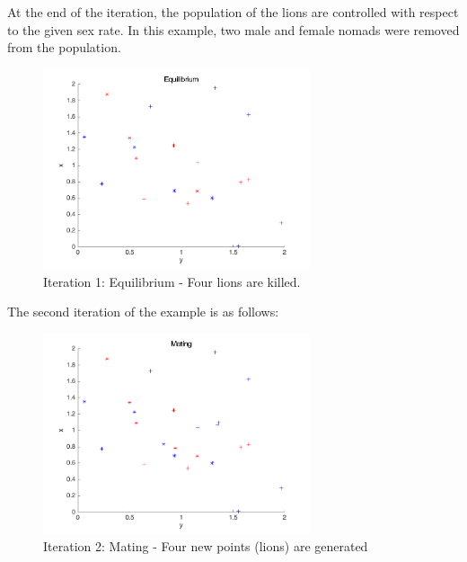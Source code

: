 At the end of the iteration, the population of the lions are controlled with respect to the given sex rate. In this example, two male and female nomads were removed from the population.

\begin{figure}[H]
\begin{center}
\includegraphics[width=0.7\textwidth]{img/mdme/equilibrium1}
\caption{Iteration 1: Equilibrium - Four lions are killed.}
\end{center}
\end{figure}

The second iteration of the example is as follows:
\begin{figure}[H]
\begin{center}
\includegraphics[width=0.7\textwidth]{img/mdme/mating2}
\caption{Iteration 2: Mating - Four new points (lions) are generated}
\end{center}
\end{figure}

